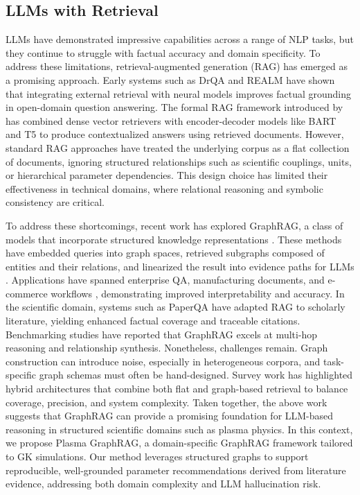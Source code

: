 \documentclass[journal]{IEEEtran}
\begin{document}
\subsection{LLMs with Retrieval}

LLMs have demonstrated impressive capabilities across a range of NLP tasks, but they continue to struggle with factual accuracy and domain specificity. To address these limitations, retrieval-augmented generation (RAG) has emerged as a promising approach. Early systems such as DrQA \cite{chen2017reading} and REALM \cite{guu2020retrieval} have shown that integrating external retrieval with neural models improves factual grounding in open-domain question answering. The formal RAG framework introduced by \cite{lewis2020retrieval} has combined dense vector retrievers with encoder-decoder models like BART and T5 to produce contextualized answers using retrieved documents. However, standard RAG approaches have treated the underlying corpus as a flat collection of documents, ignoring structured relationships such as scientific couplings, units, or hierarchical parameter dependencies. This design choice has limited their effectiveness in technical domains, where relational reasoning and symbolic consistency are critical.

To address these shortcomings, recent work has explored GraphRAG, a class of models that incorporate structured knowledge representations {\cite{10771030}}. These methods have embedded queries into graph spaces, retrieved subgraphs composed of entities and their relations, and linearized the result into evidence paths for LLMs \cite{peng2024graph}. Applications have spanned enterprise QA, manufacturing documents, and e-commerce workflows \cite{knollmeyer2025document}, demonstrating improved interpretability and accuracy. In the scientific domain, systems such as PaperQA \cite{lala2023paperqa} have adapted RAG to scholarly literature, yielding enhanced factual coverage and traceable citations. Benchmarking studies \cite{han2025rag} have reported that GraphRAG excels at multi-hop reasoning and relationship synthesis. Nonetheless, challenges remain. Graph construction can introduce noise, especially in heterogeneous corpora, and task-specific graph schemas must often be hand-designed. Survey work \cite{ji2023survey} has highlighted hybrid architectures that combine both flat and graph-based retrieval to balance coverage, precision, and system complexity. Taken together, the above work suggests that GraphRAG can provide a promising foundation for LLM-based reasoning in structured scientific domains such as plasma physics. In this context, we propose Plasma GraphRAG, a domain-specific GraphRAG framework tailored to GK simulations. Our method leverages structured graphs to support reproducible, well-grounded parameter recommendations derived from literature evidence, addressing both domain complexity and LLM hallucination risk.
\end{document}
